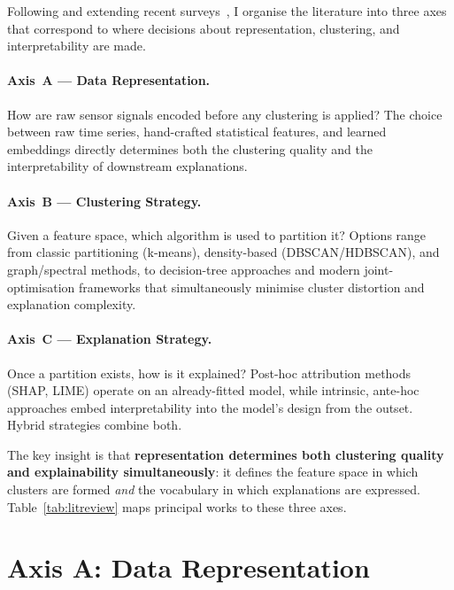 \documentclass{article}
\theoremstyle{plain}
\theoremstyle{definition}
\theoremstyle{remark}
\begin{document}
Following and extending recent surveys~\cite{hu_interpretable_2025, portugal_framework_2024,hwang_xclusters_2023},
I organise the literature into three axes that correspond to where
decisions about representation, clustering, and interpretability are made.

\paragraph{Axis~A --- Data Representation.}
How are raw sensor signals encoded before any clustering is applied?
The choice between raw time series, hand-crafted statistical features,
and learned embeddings directly determines both the clustering quality
and the interpretability of downstream explanations.

\paragraph{Axis~B --- Clustering Strategy.}
Given a feature space, which algorithm is used to partition it?
Options range from classic partitioning (k-means), density-based
(DBSCAN/HDBSCAN), and graph/spectral methods, to decision-tree approaches
and modern joint-optimisation frameworks that simultaneously minimise
cluster distortion and explanation complexity.

\paragraph{Axis~C --- Explanation Strategy.}
Once a partition exists, how is it explained? Post-hoc attribution
methods (SHAP, LIME) operate on an already-fitted model, while
intrinsic, ante-hoc approaches embed interpretability into the model's
design from the outset. Hybrid strategies combine both.

The key insight is that \textbf{representation determines both clustering
quality and explainability simultaneously}: it defines the feature space
in which clusters are formed \emph{and} the vocabulary in which
explanations are expressed. Table~\ref{tab:litreview} maps principal works
to these three axes.

\section{Axis A: Data Representation}
\label{sec:representation}
\end{document}
